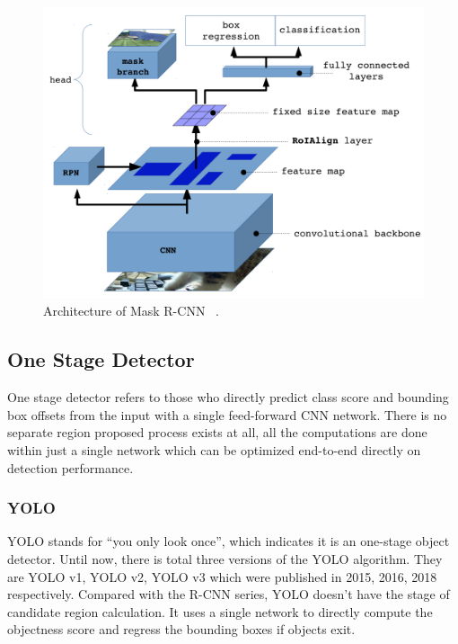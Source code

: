 \begin{figure}
    \begin{center}
    \includegraphics[scale=0.5]{figures/mask_r_cnn.png}
    \end{center}
    \caption{Architecture of Mask R-CNN ~\protect\cite{mask-r-cnn-slide}.}
    \label{fig:mask-r-cnn}
\end{figure}


\subsection{One Stage Detector}
\label{sec:related-worked-one-stage-detector}

One stage detector refers to those who directly predict class score and bounding
box offsets from the input with a single feed-forward CNN network. There is no
separate region proposed process exists at all, all the computations are done
within just a single network which can be optimized end-to-end directly on
detection performance.

\subsubsection{YOLO}
\label{sec:related-worked-yolo}

YOLO stands for ``you only look once'', which indicates it is an one-stage
object detector. Until now, there is total
three versions of the YOLO algorithm. They are YOLO v1, YOLO v2, YOLO v3 which 
were published in 2015, 2016, 2018 respectively. 
Compared with the R-CNN series, YOLO doesn't have the stage of 
candidate region calculation. It uses a single network to
directly compute the objectness score and regress the bounding
boxes if objects exit.

